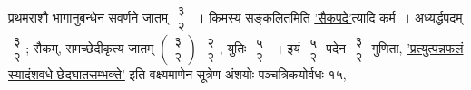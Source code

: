 \documentclass[10pt, openany]{book}
\begin{document}
{प्रथमराशौ भागानुबन्धेन सवर्णने जातम् $\begin{matrix}

\mbox{{३}}\\

\mbox{{२}}

\end{matrix}$~। किमस्य
सङ्कलितमिति \hyperref[14.1]{'सैकपदे'}त्यादि}
{कर्म~। अध्यर्द्धपदम् $\begin{matrix}

\mbox{{३}}\\

\mbox{{२}}

\end{matrix}$; सैकम्, समच्छेदीकृत्य जातम् $\left(\begin{matrix}

\mbox{{३}}\\

\mbox{{२}}

\end{matrix}\right)$
$\begin{matrix}

\mbox{{२}}\\

\mbox{{२}}

\end{matrix}$, युतिः $\begin{matrix}

\mbox{{५}}\\

\mbox{{२}}

\end{matrix}$~। इयं}
$\begin{matrix}

\mbox{{५}}\\

\mbox{{२}}

\end{matrix}$ पदेन $\begin{matrix}

\mbox{{३}}\\

\mbox{{२}}

\end{matrix}$ गुणिता, \hyperref[33.1]{'प्रत्युत्पन्नफलं स्यादंशवधे
छेदघातसम्भक्ते'} इति वक्ष्यमाणेन सूत्रेण अंशयोः पञ्चत्रिकयोर्वधः १५,


\newpage
\end{document}
